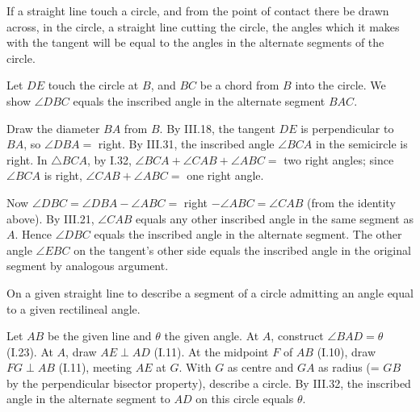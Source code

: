 \begin{claim}
\label{prop:III.32}
If a straight line touch a circle, and from the point of contact
there be drawn across, in the circle, a straight line cutting the
circle, the angles which it makes with the tangent will be equal to
the angles in the alternate segments of the circle.
\end{claim}
\begin{evidence}
\label{ev:III.32}
Let $DE$ touch the circle at $B$, and $BC$ be a chord from $B$ into
the circle.  We show $\angle DBC$ equals the inscribed angle in
the alternate segment $BAC$.

Draw the diameter $BA$ from $B$.  By III.18, the tangent $DE$ is
perpendicular to $BA$, so $\angle DBA = $ right.  By III.31, the
inscribed angle $\angle BCA$ in the semicircle is right.  In
$\triangle BCA$, by I.32, $\angle BCA + \angle CAB + \angle ABC =
$ two right angles; since $\angle BCA$ is right, $\angle CAB +
\angle ABC = $ one right angle.

Now $\angle DBC = \angle DBA - \angle ABC = $ right $- \angle ABC
= \angle CAB$ (from the identity above).  By III.21, $\angle CAB$
equals any other inscribed angle in the same segment as $A$.
Hence $\angle DBC$ equals the inscribed angle in the alternate
segment.  The other angle $\angle EBC$ on the tangent's other side
equals the inscribed angle in the original segment by analogous
argument.
\end{evidence}

\begin{claim}
\label{prop:III.33}
On a given straight line to describe a segment of a circle admitting
an angle equal to a given rectilineal angle.
\end{claim}
\begin{evidence}
\label{ev:III.33}
Let $AB$ be the given line and $\theta$ the given angle.  At $A$,
construct $\angle BAD = \theta$ (I.23).  At $A$, draw $AE
\perp AD$ (I.11).  At the midpoint $F$ of $AB$ (I.10), draw
$FG \perp AB$ (I.11), meeting $AE$ at $G$.  With $G$ as centre and
$GA$ as radius (= $GB$ by the perpendicular bisector property),
describe a circle.  By III.32, the inscribed angle in the alternate
segment to $AD$ on this circle equals $\theta$.
\end{evidence}

